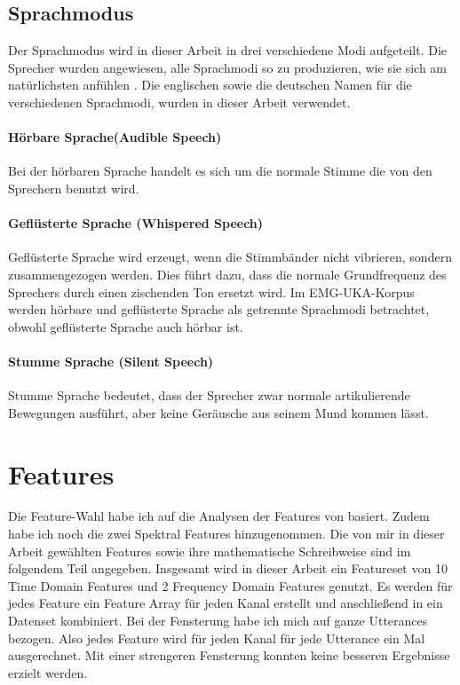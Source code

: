 \subsection{Sprachmodus}
Der Sprachmodus wird in dieser Arbeit in drei verschiedene Modi aufgeteilt. Die Sprecher wurden angewiesen, alle Sprachmodi so zu produzieren, wie sie sich am natürlichsten anfühlen \cite{WaJaSch2014-IS}. Die englischen sowie die deutschen Namen für die verschiedenen Sprachmodi, wurden in dieser Arbeit verwendet.

\paragraph{Hörbare Sprache(Audible Speech)}
Bei der hörbaren Sprache handelt es sich um die normale Stimme die von den Sprechern benutzt wird.   

\paragraph{Geflüsterte Sprache (Whispered Speech)}
Geflüsterte Sprache wird erzeugt, wenn die Stimmbänder nicht vibrieren, sondern zusammengezogen werden.  Dies führt dazu, dass die normale Grundfrequenz des Sprechers durch einen zischenden Ton ersetzt wird. Im EMG-UKA-Korpus werden hörbare und geflüsterte Sprache als getrennte Sprachmodi betrachtet, obwohl geflüsterte Sprache auch hörbar ist.

\paragraph{Stumme Sprache (Silent Speech)}
Stumme Sprache bedeutet, dass der Sprecher zwar normale artikulierende Bewegungen ausführt, aber keine Geräusche aus seinem Mund kommen lässt.


\section{Features}
Die Feature-Wahl habe ich auf die Analysen der Features von \cite{Phinyo2012-FT} basiert. Zudem habe ich noch die zwei Spektral Features hinzugenommen. Die von mir in dieser Arbeit gewählten Features sowie ihre mathematische Schreibweise  sind im folgendem Teil angegeben. Insgesamt wird in dieser Arbeit ein Featureset von 10 Time Domain Features und 2 Frequency Domain Features genutzt. Es werden für jedes Feature ein Feature Array für jeden Kanal erstellt und anschließend in ein Datenset kombiniert. Bei der Fensterung habe ich mich auf ganze Utterances bezogen. Also jedes Feature wird für jeden Kanal für jede Utterance ein Mal ausgerechnet. Mit einer strengeren Fensterung konnten keine besseren Ergebnisse erzielt werden.  



